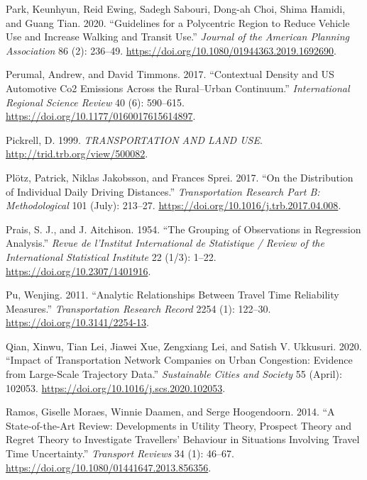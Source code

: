 \documentclass[
  12pt,
]{article}
\newlength{\cslhangindent}
\newlength{\cslentryspacingunit} %
\newenvironment{CSLReferences}[2] %
 {%
  \setlength{\parindent}{0pt}
  \ifodd #1
  \let\oldpar\par
  \def\par{\hangindent=\cslhangindent\oldpar}
  \fi
  \setlength{\parskip}{#2\cslentryspacingunit}
 }%
 {}
\begin{document}
\begin{CSLReferences}{1}{0}
\leavevmode{}%
Park, Keunhyun, Reid Ewing, Sadegh Sabouri, Dong-ah Choi, Shima Hamidi, and Guang Tian. 2020. {``Guidelines for a {Polycentric Region} to {Reduce Vehicle Use} and {Increase Walking} and {Transit Use}.''} \emph{Journal of the American Planning Association} 86 (2): 236--49. \url{https://doi.org/10.1080/01944363.2019.1692690}.

\leavevmode{}%
Perumal, Andrew, and David Timmons. 2017. {``Contextual {Density} and {US Automotive Co2 Emissions} Across the {Rural}--{Urban Continuum}.''} \emph{International Regional Science Review} 40 (6): 590--615. \url{https://doi.org/10.1177/0160017615614897}.

\leavevmode{}%
Pickrell, D. 1999. \emph{{TRANSPORTATION AND LAND USE}}. \url{http://trid.trb.org/view/500082}.

\leavevmode{}%
Plötz, Patrick, Niklas Jakobsson, and Frances Sprei. 2017. {``On the Distribution of Individual Daily Driving Distances.''} \emph{Transportation Research Part B: Methodological} 101 (July): 213--27. \url{https://doi.org/10.1016/j.trb.2017.04.008}.

\leavevmode{}%
Prais, S. J., and J. Aitchison. 1954. {``The {Grouping} of {Observations} in {Regression Analysis}.''} \emph{Revue de l'Institut International de Statistique / Review of the International Statistical Institute} 22 (1/3): 1--22. \url{https://doi.org/10.2307/1401916}.

\leavevmode{}%
Pu, Wenjing. 2011. {``Analytic {Relationships} Between {Travel Time Reliability Measures}.''} \emph{Transportation Research Record} 2254 (1): 122--30. \url{https://doi.org/10.3141/2254-13}.

\leavevmode{}%
Qian, Xinwu, Tian Lei, Jiawei Xue, Zengxiang Lei, and Satish V. Ukkusuri. 2020. {``Impact of Transportation Network Companies on Urban Congestion: {Evidence} from Large-Scale Trajectory Data.''} \emph{Sustainable Cities and Society} 55 (April): 102053. \url{https://doi.org/10.1016/j.scs.2020.102053}.

\leavevmode{}%
Ramos, Giselle Moraes, Winnie Daamen, and Serge Hoogendoorn. 2014. {``A {State-of-the-Art Review}: {Developments} in {Utility Theory}, {Prospect Theory} and {Regret Theory} to {Investigate Travellers}' {Behaviour} in {Situations Involving Travel Time Uncertainty}.''} \emph{Transport Reviews} 34 (1): 46--67. \url{https://doi.org/10.1080/01441647.2013.856356}.


\end{CSLReferences}
\end{document}
